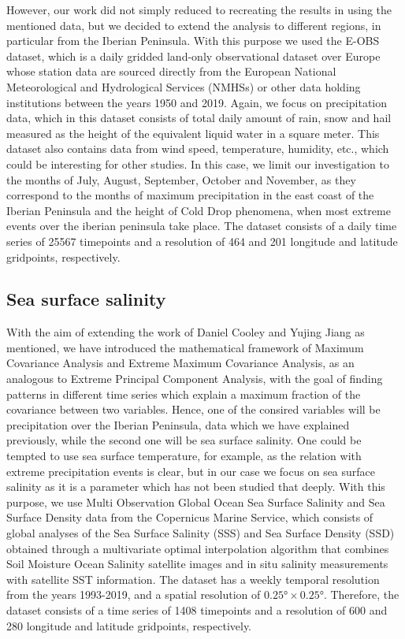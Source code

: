 \documentclass[11pt, oneside]{book}
\theoremstyle{plain}
\theoremstyle{remark}
\begin{document}
However, our work did not simply reduced to recreating the results in
\cite{jiang-cooley} using the mentioned data, but we decided to extend the
analysis to different regions, in particular from the Iberian Peninsula. With
this purpose we used the E-OBS dataset, which is a daily gridded land-only
observational dataset over Europe whose station data are sourced directly from
the European National Meteorological and Hydrological Services (NMHSs) or other
data holding institutions between the years 1950 and 2019. Again, we focus on
precipitation data, which in this dataset consists of total daily amount of
rain, snow and hail measured as the height of the equivalent liquid water in a
square meter. This dataset also contains data from wind speed, temperature,
humidity, etc., which could be interesting for other studies. In this case, we
limit our investigation to the months of July, August, September, October and
November, as they correspond to the months of maximum precipitation in the east
coast of the Iberian Peninsula and the height of Cold Drop phenomena, when most
extreme events over the iberian peninsula take place. The dataset consists of a
daily time series of 25567 timepoints and a resolution of 464 and 201 longitude
and latitude gridpoints, respectively.

\subsection{Sea surface salinity}
With the aim of extending the work of Daniel Cooley and Yujing Jiang as
mentioned, we have introduced the mathematical framework of Maximum Covariance
Analysis and Extreme Maximum Covariance Analysis, as an analogous to Extreme
Principal Component Analysis, with the goal of finding patterns in different
time series which explain a maximum fraction of the covariance between two
variables. Hence, one of the consired variables will be precipitation over the
Iberian Peninsula, data which we have explained previously, while the second one
will be sea surface salinity. One could be tempted to use sea surface
temperature, for example, as the relation with extreme precipitation events is
clear, but in our case we focus on sea surface salinity as it is a parameter
which has not been studied that deeply. With this purpose, we use Multi
Observation Global Ocean Sea Surface Salinity and Sea Surface Density data from
the Copernicus Marine Service, which consists of global analyses of the Sea
Surface Salinity (SSS) and Sea Surface Density (SSD) obtained through a
multivariate optimal interpolation algorithm that combines Soil Moisture Ocean
Salinity satellite images and in situ salinity measurements with satellite SST
information. The dataset has a weekly temporal resolution from the years
1993-2019, and a spatial resolution of $\ang{0.25}\times\ang{0.25}$. Therefore,
the dataset consists of a time series of 1408 timepoints and a resolution of 600
and 280 longitude and latitude gridpoints, respectively.
\end{document}
